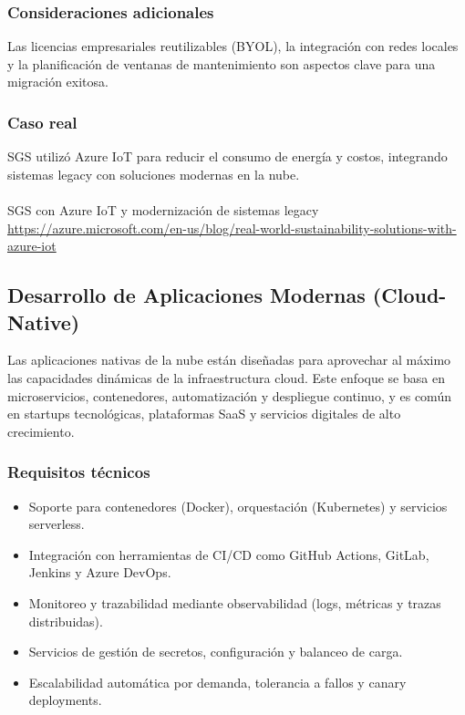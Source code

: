 {            \subsubsection{Consideraciones adicionales}
                Las licencias empresariales reutilizables (BYOL), la integración con redes locales y la planificación de ventanas de mantenimiento son aspectos clave para una migración exitosa.

            \subsubsection{Caso real}
                SGS utilizó Azure IoT para reducir el consumo de energía y costos, integrando sistemas legacy con soluciones modernas en la nube.

                \paragraph{}SGS con Azure IoT y modernización de sistemas legacy \href{https://azure.microsoft.com/en-us/blog/real-world-sustainability-solutions-with-azure-iot}{https://azure.microsoft.com/en-us/blog/real-world-sustainability-solutions-with-azure-iot}
                
        \subsection{Desarrollo de Aplicaciones Modernas (Cloud-Native)}
            Las aplicaciones nativas de la nube están diseñadas para aprovechar al máximo las capacidades dinámicas de la infraestructura cloud. Este enfoque se basa en microservicios, contenedores, automatización y despliegue continuo, y es común en startups tecnológicas, plataformas SaaS y servicios digitales de alto crecimiento.
            
            \subsubsection{Requisitos técnicos}
                \begin{itemize}
                    \item Soporte para contenedores (Docker), orquestación (Kubernetes) y servicios serverless.
                    \item Integración con herramientas de CI/CD como GitHub Actions, GitLab, Jenkins y Azure DevOps.
                    \item Monitoreo y trazabilidad mediante observabilidad (logs, métricas y trazas distribuidas).
                    \item Servicios de gestión de secretos, configuración y balanceo de carga.
                    \item Escalabilidad automática por demanda, tolerancia a fallos y canary deployments.
                \end{itemize}
            
}
